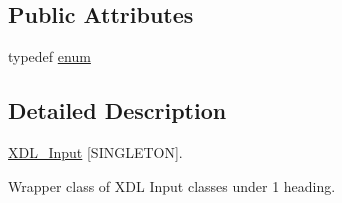 \subsection*{Public Attributes}
\begin{DoxyCompactItemize}
\item 
typedef \hyperlink{class_x_d_l___input_a9f4f7d829c9e50b0556aa9848243b098}{enum}
\end{DoxyCompactItemize}


\subsection{Detailed Description}
\hyperlink{class_x_d_l___input}{X\-D\-L\-\_\-\-Input} \mbox{[}S\-I\-N\-G\-L\-E\-T\-O\-N\mbox{]}. 

Wrapper class of X\-D\-L Input classes under 1 heading. 

